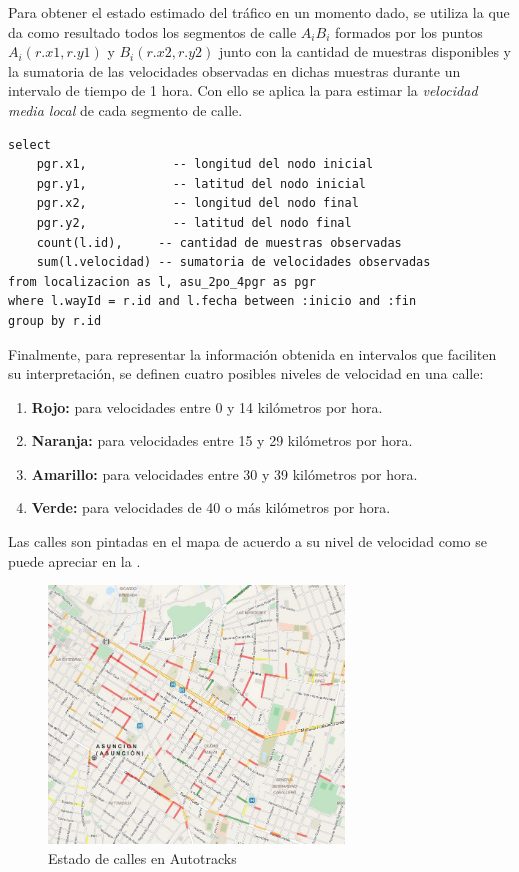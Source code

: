 Para obtener el estado estimado del tráfico en un momento dado, se utiliza la  que da como resultado todos los segmentos de calle $A_iB_i$ formados por los puntos $A_i(r.x1, r.y1)$ y $B_i(r.x2, r.y2)$ junto con la cantidad de muestras disponibles y la sumatoria de las velocidades observadas en dichas muestras durante un intervalo de tiempo de 1 hora. Con ello se aplica la  para estimar la \emph{velocidad media local} de cada segmento de calle.

\begin{lstlisting}[float,floatplacement=tbh,caption={Obtención de datos de tráfico}, label={lst:trafico}]
select 
    pgr.x1,            -- longitud del nodo inicial
    pgr.y1,            -- latitud del nodo inicial
    pgr.x2,            -- longitud del nodo final
    pgr.y2,            -- latitud del nodo final
    count(l.id),     -- cantidad de muestras observadas
    sum(l.velocidad) -- sumatoria de velocidades observadas
from localizacion as l, asu_2po_4pgr as pgr
where l.wayId = r.id and l.fecha between :inicio and :fin
group by r.id
\end{lstlisting}

Finalmente, para representar la información obtenida en intervalos que faciliten su interpretación, se definen cuatro posibles niveles de velocidad en una calle:
\begin{enumerate}
\item \textbf{Rojo:}  para velocidades entre 0 y 14 kilómetros por hora.
\item \textbf{Naranja:}  para velocidades entre 15 y 29 kilómetros por hora.
\item \textbf{Amarillo:}  para velocidades entre 30 y 39 kilómetros por hora.
\item \textbf{Verde:}  para velocidades de 40 o más kilómetros por hora.
\end{enumerate}
Las calles son pintadas en el mapa de acuerdo a su nivel de velocidad como se puede apreciar en la .
\begin{figure}[h]
	\centering
	\includegraphics[width=0.7\textwidth]{capitulos/6/figuras/figura3.jpg}
	\caption{\label{fig:calles} Estado de calles en Autotracks}	
\end{figure}
